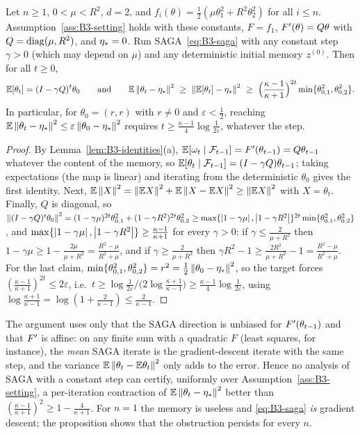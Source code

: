 \begin{proposition}\label{prop:B3-lower}
Let $n\ge1$, $0<\mu<R^2$, $d=2$, and $f_i(\theta)=\frac12(\mu\theta_1^2+R^2\theta_2^2)$ for all $i\le n$. Assumption~\ref{ass:B3-setting} holds with these constants, $F=f_1$, $F'(\theta)=Q\theta$ with $Q=\operatorname{diag}(\mu,R^2)$, and $\eta_\ast=0$. Run SAGA~\eqref{eq:B3-saga} with any constant step $\gamma>0$ (which may depend on $\mu$) and any deterministic initial memory $z^{(0)}$. Then for all $t\ge0$,
\begin{equation}\label{eq:B3-lower}
\E[\theta_t]=(I-\gamma Q)^t\theta_0\qquad\text{and}\qquad
\E\norm{\theta_t-\etastar}^2\ \ge\ \norm{\E[\theta_t]-\etastar}^2\ \ge\ \Big(\frac{\kappa-1}{\kappa+1}\Big)^{2t}\min\{\theta_{0,1}^2,\theta_{0,2}^2\}.
\end{equation}
In particular, for $\theta_0=(r,r)$ with $r\ne0$ and $\varepsilon<\frac12$, reaching $\mathbb{E}\left\|\theta_t-\eta_\ast\right\|^2\le\varepsilon\left\|\theta_0-\eta_\ast\right\|^2$ requires $t\ge\frac{\kappa-1}{4}\log\frac1{2\varepsilon}$, whatever the step.
\end{proposition}
\begin{proof}
By Lemma~\ref{lem:B3-identities}(a), $\mathbb{E}[\omega_t\mid\mathcal F_{t-1}]=F'(\theta_{t-1})=Q\theta_{t-1}$ whatever the content of the memory, so $\mathbb{E}[\theta_t\mid\mathcal F_{t-1}]=(I-\gamma Q)\theta_{t-1}$; taking expectations (the map is linear) and iterating from the deterministic $\theta_0$ gives the first identity. Next, $\mathbb{E}\left\|X\right\|^2=\left\|\mathbb{E} X\right\|^2+\mathbb{E}\left\|X-\mathbb{E} X\right\|^2\ge\left\|\mathbb{E} X\right\|^2$ with $X=\theta_t$. Finally, $Q$ is diagonal, so $\left\|(I-\gamma Q)^t\theta_0\right\|^2=(1-\gamma\mu)^{2t}\theta_{0,1}^2+(1-\gamma R^2)^{2t}\theta_{0,2}^2\ge\max\{\left|1-\gamma\mu\right|,\left|1-\gamma R^2\right|\}^{2t}\min\{\theta_{0,1}^2,\theta_{0,2}^2\}$, and $\max\{\left|1-\gamma\mu\right|,\left|1-\gamma R^2\right|\}\ge\frac{\kappa-1}{\kappa+1}$ for every $\gamma>0$: if $\gamma\le\frac{2}{\mu+R^2}$ then $1-\gamma\mu\ge1-\frac{2\mu}{\mu+R^2}=\frac{R^2-\mu}{R^2+\mu}$, and if $\gamma\ge\frac{2}{\mu+R^2}$ then $\gamma R^2-1\ge\frac{2R^2}{\mu+R^2}-1=\frac{R^2-\mu}{R^2+\mu}$. For the last claim, $\min\{\theta_{0,1}^2,\theta_{0,2}^2\}=r^2=\frac12\left\|\theta_0-\eta_\ast\right\|^2$, so the target forces $(\frac{\kappa-1}{\kappa+1})^{2t}\le2\varepsilon$, i.e.\ $t\ge\log\frac1{2\varepsilon}\big/\big(2\log\frac{\kappa+1}{\kappa-1}\big)\ge\frac{\kappa-1}{4}\log\frac1{2\varepsilon}$, using $\log\frac{\kappa+1}{\kappa-1}=\log(1+\frac2{\kappa-1})\le\frac{2}{\kappa-1}$.
\end{proof}
The argument uses only that the SAGA direction is unbiased for $F'(\theta_{t-1})$ and that $F'$ is affine: on any finite sum with a quadratic $F$ (least squares, for instance), the \emph{mean} SAGA iterate is the gradient-descent iterate with the same step, and the variance $\mathbb{E}\left\|\theta_t-\mathbb{E}\theta_t\right\|^2$ only adds to the error. Hence no analysis of SAGA with a constant step can certify, uniformly over Assumption~\ref{ass:B3-setting}, a per-iteration contraction of $\mathbb{E}\left\|\theta_t-\eta_\ast\right\|^2$ better than $(\frac{\kappa-1}{\kappa+1})^2\ge1-\frac{4}{\kappa+1}$. For $n=1$ the memory is useless and \eqref{eq:B3-saga} \emph{is} gradient descent; the proposition shows that the obstruction persists for every $n$.


